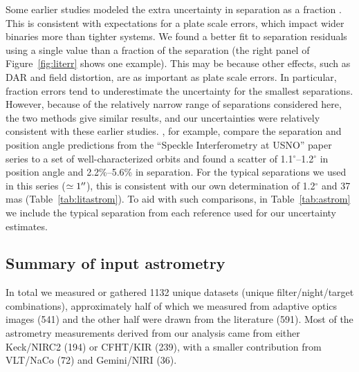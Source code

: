 \documentclass[twocolumn]{aastex62}
\begin{document}
Some earlier studies modeled the extra uncertainty in separation as a fraction \citep[e.g.,][]{Hrt2008,Hor2011,Tok2012d}. This is consistent with expectations for a plate scale errors, which impact wider binaries more than tighter systems. We found a better fit to separation residuals using a single value than a fraction of the separation (the right panel of Figure~\ref{fig:literr} shows one example). This may be because other effects, such as DAR and field distortion, are as important as plate scale errors. In particular, fraction errors tend to underestimate the uncertainty for the smallest separations. However, because of the relatively narrow range of separations considered here, the two methods give similar results, and our uncertainties were relatively consistent with these earlier studies. \citet{2007AJ....134.1671M}, for example, compare the separation and position angle predictions from the ``Speckle Interferometry at USNO'' paper series to a set of well-characterized orbits and found a scatter of 1.1$^{\circ}$--1.2$^{\circ}$ in position angle and 2.2\%--5.6\% in separation. For the typical separations we used in this series ($\simeq1\mbox{$^{\prime\prime}$}$), this is consistent with our own determination of 1.2$^{\circ}$ and 37\,mas (Table~\ref{tab:litastrom}). To aid with such comparisons, in Table~\ref{tab:astrom} we include the typical separation from each reference used for our uncertainty estimates.


\subsection{Summary of input astrometry}

In total we measured or gathered 1132 unique datasets (unique filter/night/target combinations), approximately half of which we measured from adaptive optics images (541) and the other half were drawn from the literature (591). Most of the astrometry measurements derived from our analysis came from either Keck/NIRC2 (194) or CFHT/KIR (239), with a smaller contribution from VLT/NaCo (72) and Gemini/NIRI (36). 
\end{document}
